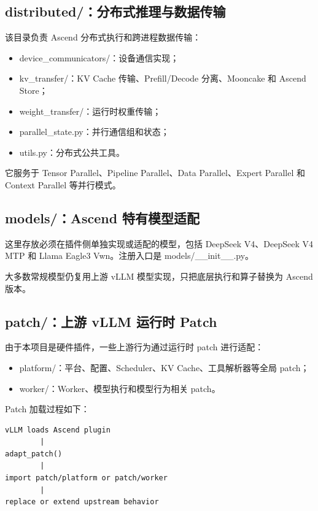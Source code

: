 \documentclass[UTF8,11pt,a4paper]{ctexart}
\DeclareRobustCommand{\folder}[1]{\texttt{\detokenize{#1}}}
\def\folder#1{#1}%
\begin{document}
\subsection{\folder{distributed/}：分布式推理与数据传输}

该目录负责 Ascend 分布式执行和跨进程数据传输：

\begin{itemize}
  \item \folder{device_communicators/}：设备通信实现；
  \item \folder{kv_transfer/}：KV Cache 传输、Prefill/Decode 分离、Mooncake 和 Ascend Store；
  \item \folder{weight_transfer/}：运行时权重传输；
  \item \folder{parallel_state.py}：并行通信组和状态；
  \item \folder{utils.py}：分布式公共工具。
\end{itemize}

它服务于 Tensor Parallel、Pipeline Parallel、Data Parallel、Expert Parallel 和 Context Parallel 等并行模式。

\subsection{\folder{models/}：Ascend 特有模型适配}

这里存放必须在插件侧单独实现或适配的模型，包括 DeepSeek V4、DeepSeek V4 MTP 和 Llama Eagle3 Vwn。注册入口是 \folder{models/__init__.py}。

大多数常规模型仍复用上游 vLLM 模型实现，只把底层执行和算子替换为 Ascend 版本。

\subsection{\folder{patch/}：上游 vLLM 运行时 Patch}

由于本项目是硬件插件，一些上游行为通过运行时 patch 进行适配：

\begin{itemize}
  \item \folder{platform/}：平台、配置、Scheduler、KV Cache、工具解析器等全局 patch；
  \item \folder{worker/}：Worker、模型执行和模型行为相关 patch。
\end{itemize}

Patch 加载过程如下：

\begin{lstlisting}
vLLM loads Ascend plugin
        |
adapt_patch()
        |
import patch/platform or patch/worker
        |
replace or extend upstream behavior
\end{lstlisting}
\end{document}
